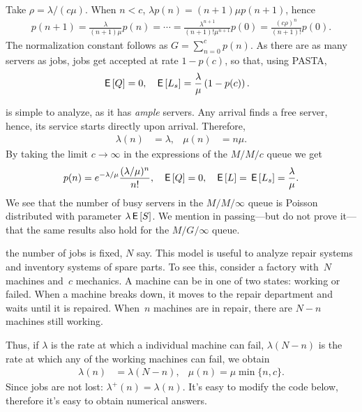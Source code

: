 \documentclass[stochastic-or.tex]{subfiles}
\begin{document}
Take $\rho = \lambda/(c \mu)$. When $n<c$, $\lambda p(n) = (n+1)\mu p(n+1)$, hence
 \begin{align*}
   p(n+1) = \frac{\lambda}{(n+1)\mu }p(n) = \cdots = \frac{\lambda^{n+1}}{(n+1)!\mu^{n+1}} p(0) = \frac{(c\rho)^{n}}{(n+1)!} p(0).
\end{align*}
The normalization constant follows  as $G = \sum_{n=0}^{c}p(n)$. As there are as many servers as jobs, jobs get accepted at rate $1-p(c)$, so that, using PASTA,
 \begin{align*}
   \,\mathsf{E}\left[Q\right] &= 0, & \,\mathsf{E}\left[L_s\right] &= \frac{\lambda}{\mu} \left(1- p(c)\right).
\end{align*}


 is simple to analyze, as it has \emph{ample} servers.
Any arrival finds a free server, hence, its service  starts directly upon arrival.
Therefore,
\begin{align*}
\lambda(n)&=\lambda, & \mu(n) &= n \mu.
\end{align*}
By taking the limit $c\to \infty$ in the expressions of the $M/M/c$ queue we get
\begin{align*}
  p(n) &= e^{-\lambda/\mu} \frac{(\lambda/\mu)^n}{n!}, & \,\mathsf{E}\left[Q\right]&=0, & \,\mathsf{E}\left[L\right] = \,\mathsf{E}\left[L_s\right] = \frac \lambda \mu.
\end{align*}
We see that the number of busy servers in the $M/M/\infty$ queue is Poisson distributed with parameter $\lambda \,\mathsf{E}\left[S\right]$.
We mention in passing---but do not prove it---that the same results also hold for the $M/G/\infty$ queue.

 the number of jobs is fixed, $N$ say.
This model is useful to analyze repair systems and inventory systems of spare parts.
To see this, consider a factory with~$N$ machines and~$c$ mechanics.
A machine can be in one of two states: working or failed.
When a machine breaks down, it moves to the repair department and waits until it is repaired.
When~$n$ machines are in repair, there are $N-n$ machines still working.

Thus, if $\lambda$ is the rate at which a individual machine can fail, $\lambda(N-n)$ is the rate at which any of the working machines can fail,
we obtain
\begin{align*}
  \lambda(n) &= \lambda (N-n), & \mu(n) = \mu \min\{n, c\}.
\end{align*}
Since jobs are not lost: $\lambda^{+}(n) = \lambda(n)$.
It's easy to modify the code below, therefore it's easy to obtain numerical answers.
\end{document}
